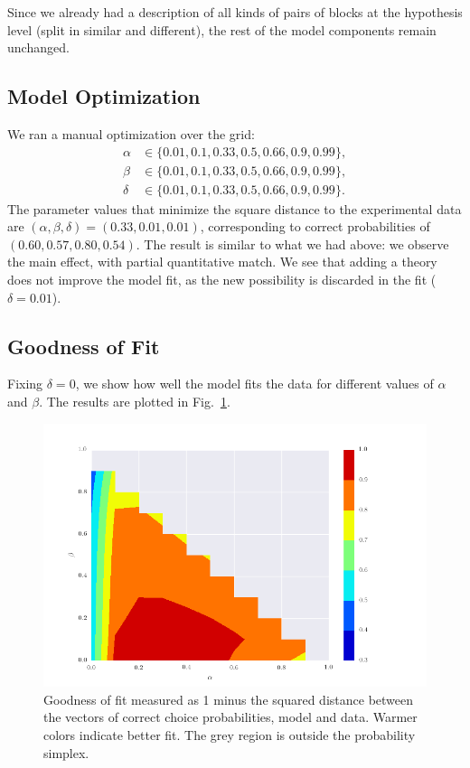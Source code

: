\documentclass[11pt, a4paper]{article}
\begin{document}
Since we already had a description of all kinds of pairs of blocks at the hypothesis level (split in similar and different), the rest of the model components remain unchanged. 
 
\subsection*{Model Optimization}
We ran a manual optimization over the grid:
\begin{equation}
\begin{split}
\alpha&\in\{0.01, 0.1, 0.33, 0.5, 0.66, 0.9, 0.99\},\\
\beta&\in\{0.01, 0.1, 0.33, 0.5, 0.66, 0.9, 0.99\},\\
\delta&\in\{0.01, 0.1, 0.33, 0.5, 0.66, 0.9, 0.99\}.
\end{split}
\end{equation}
The parameter values that minimize the square distance to the experimental data are $(\alpha, \beta, \delta)=(0.33,0.01,0.01)$, corresponding to correct probabilities of $(0.60, 0.57, 0.80, 0.54)$. The result is similar to what we had above: we observe the main effect, with partial quantitative match. We see that adding a theory does not improve the model fit, as the new possibility is discarded in the fit ($\delta=0.01$). 
 
\subsection*{Goodness of Fit}
Fixing $\delta=0$, we show how well the model fits the data for different values of $\alpha$ and $\beta$. The results are plotted in Fig.~\ref{fig:GoF}.
 
\begin{figure}[ht]
\centering
\includegraphics[width=12cm]{Figures/GoF.png}
\caption{Goodness of fit measured as 1 minus the squared distance between the vectors of correct choice probabilities, model and data. Warmer colors indicate better fit. The grey region is outside the probability simplex.}
\label{fig:GoF}
\end{figure}
 
\end{document}
